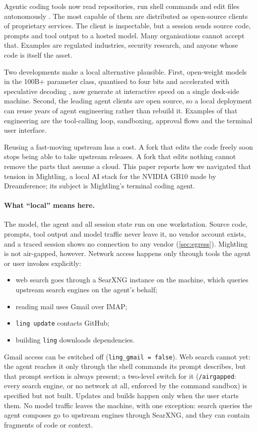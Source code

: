 \documentclass[11pt]{article}
\newcommand{\code}[1]{\texttt{#1}}
\begin{document}
Agentic coding tools now read repositories, run shell commands and edit files autonomously
\cite{yao2023react,yang2024sweagent,wang2024openhands}. The most capable of them are distributed as
open-source clients of proprietary services. The client is inspectable, but a session sends source
code, prompts and tool output to a hosted model. Many organisations cannot accept that. Examples
are regulated industries, security research, and anyone whose code is itself the asset.

Two developments make a local alternative plausible. First, open-weight models in the 100B+
parameter class, quantised to four bits \cite{cheng2023autoround} and accelerated with speculative
decoding \cite{leviathan2023speculative,chen2026dflash}, now generate at interactive speed on a
single desk-side machine. Second, the leading agent clients are open source, so a local deployment
can reuse years of agent engineering rather than rebuild it. Examples of that engineering are the
tool-calling loop, sandboxing, approval flows and the terminal user interface.

Reusing a fast-moving upstream has a cost. A fork that edits the code freely soon stops being able
to take upstream releases. A fork that edits nothing cannot remove the parts that assume a cloud.
This paper reports how we navigated that tension in Mightling, a local AI stack for the NVIDIA GB10
made by Dreamference; its subject is Mightling's terminal coding agent.

\paragraph{What ``local'' means here.} The model, the agent and all session state run on one
workstation. Source code, prompts, tool output and model traffic never leave it, no vendor
account exists, and a traced session shows no connection to any vendor
(\cref{sec:egress}). Mightling is not air-gapped, however. Network access happens only through tools the
agent or user invokes explicitly:
\begin{itemize}
  \item web search goes through a SearXNG \cite{searxng} instance on the machine, which queries
    upstream search engines on the agent's behalf;
  \item reading mail uses Gmail over IMAP;
  \item \code{ling update} contacts GitHub;
  \item building \code{ling} downloads dependencies.
\end{itemize}
Gmail access can be switched off (\code{ling\_gmail = false}). Web search cannot yet: the
agent reaches it only through the shell commands its prompt describes, but that prompt section is
always present; a two-level switch for it (\code{/airgapped}: every search engine, or no network
at all, enforced by the command sandbox) is specified but not built.
Updates and builds happen only when the user starts them. No model traffic leaves
the machine, with one exception: search queries the agent composes go to upstream engines through
SearXNG, and they can contain fragments of code or context.
\end{document}
